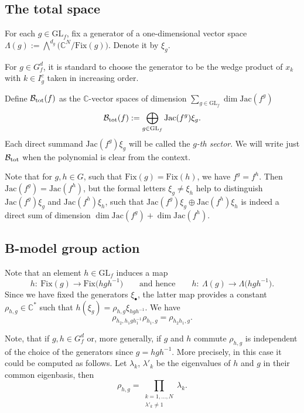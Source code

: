 \documentclass[10pt,a4paper]{amsart}
\numberwithin{equation}{section}
\newcommand{\CC}{{\mathbb{C}}}
\newcommand{\GL}{{\mathrm{GL}}}
\newcommand{\Jac}{\mathrm{Jac}}
\newcommand{\Fix}{\mathrm{Fix}}
\def\B{{\mathcal B}}
\begin{document}
\subsection{The total space}
For each $g\in \GL_f$, fix a generator of a one-dimensional vector space $\Lambda(g):=\bigwedge^{d_g}\bigl(\CC^N/\Fix(g)\bigr)$. Denote it by $\xi_g$.

For $g\in G_f^d$, it is standard to choose the generator to be the wedge product of $x_k$ with $k\in I^c_g$ taken in increasing order.

Define $\B_{\rm tot}(f)$ as the $\CC$-vector spaces of dimension $\sum_{g \in \GL_f} \dim \Jac(f^g)$
\begin{equation}\label{eq: Btot in jac sectors}
	\B_{\rm tot}(f) := \bigoplus_{g \in \GL_f} \Jac(f^g) \xi_g.
\end{equation}
Each direct summand $\Jac(f^g) \xi_g$ will be called the \textit{$g$-th sector}.
We will write just $\B_{\rm tot}$ when the polynomial is clear from the context.

\begin{Remark}
Note that for $g,h \in G$, such that $\Fix(g) = \Fix(h)$, we have $f^g = f^h$. Then $\Jac(f^g) = \Jac(f^h)$, but the formal letters $\xi_g \neq \xi_h$ help to distinguish $\Jac(f^g) \xi_g$ and $\Jac(f^h)\xi_h$, such that $\Jac(f^g) \xi_g \oplus \Jac(f^h)\xi_h$ is indeed a direct sum of dimension $\dim\Jac(f^g)+\dim\Jac(f^h)$.
\end{Remark}

\subsection{B-model group action}

Note that an element $h\in\GL_f$ induces a map
\[h\colon \ \Fix(g)\to \Fix\bigl(hgh^{-1}\bigr)\qquad \text{and hence}\qquad h\colon\ \Lambda(g)\to \Lambda\bigl(hgh^{-1}\bigr).\] Since we have fixed the generators $\xi_\bullet$, the latter map provides a constant $\rho_{h,g}\in\CC^*$ such that $h ( \xi_{g} ) = \rho_{h,g} \xi_{hgh^{-1}}$. We have
\begin{equation}\label{eq: rho relation}
 \rho_{h_2,h_1gh_1^{-1}}\rho_{h_1,g}=\rho_{h_2h_1,g}.
\end{equation}

Note, that if $g,h\in G_f^d$ or, more generally, if $g$ and $h$ commute $\rho_{h,g}$ is independent of the choice of the generators since $g=hgh^{-1}$. More precisely, in this case it could be computed as follows. Let $\lambda_k$, $\lambda'_k$ be the eigenvalues of $h$ and $g$ in their common eigenbasis, then
\begin{equation*}%
 \rho_{h,g}=\prod_{\substack{ k=1,\dots,N \\ \lambda'_k \neq 1}} \lambda_k.
\end{equation*}
\end{document}
